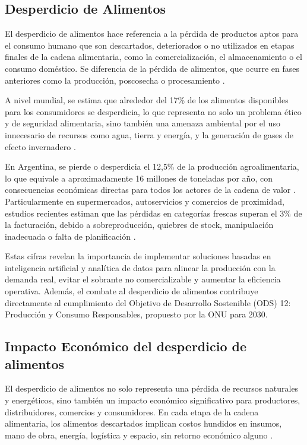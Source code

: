 \subsection{Desperdicio de Alimentos}

El desperdicio de alimentos hace referencia a la pérdida de productos aptos para el consumo humano que son descartados, deteriorados o no utilizados en etapas finales de la cadena alimentaria, como la comercialización, el almacenamiento o el consumo doméstico. Se diferencia de la pérdida de alimentos, que ocurre en fases anteriores como la producción, poscosecha o procesamiento \parencite{fao2019}.

A nivel mundial, se estima que alrededor del 17\% de los alimentos disponibles para los consumidores se desperdicia, lo que representa no solo un problema ético y de seguridad alimentaria, sino también una amenaza ambiental por el uso innecesario de recursos como agua, tierra y energía, y la generación de gases de efecto invernadero \parencite{unep2021}.

En Argentina, se pierde o desperdicia el 12{,}5\% de la producción agroalimentaria, lo que equivale a aproximadamente 16 millones de toneladas por año, con consecuencias económicas directas para todos los actores de la cadena de valor \parencite{tiscornia2022}. Particularmente en supermercados, autoservicios y comercios de proximidad, estudios recientes estiman que las pérdidas en categorías frescas superan el 3\% de la facturación, debido a sobreproducción, quiebres de stock, manipulación inadecuada o falta de planificación \parencite{weteam2021}.

Estas cifras revelan la importancia de implementar soluciones basadas en inteligencia artificial y analítica de datos para alinear la producción con la demanda real, evitar el sobrante no comercializable y aumentar la eficiencia operativa. Además, el combate al desperdicio de alimentos contribuye directamente al cumplimiento del Objetivo de Desarrollo Sostenible (ODS) 12: Producción y Consumo Responsables, propuesto por la ONU para 2030.

\subsection{Impacto Económico del desperdicio de alimentos}

El desperdicio de alimentos no solo representa una pérdida de recursos naturales y energéticos, sino también un impacto económico significativo para productores, distribuidores, comercios y consumidores. En cada etapa de la cadena alimentaria, los alimentos descartados implican costos hundidos en insumos, mano de obra, energía, logística y espacio, sin retorno económico alguno \parencite{gustavsson2011}.


